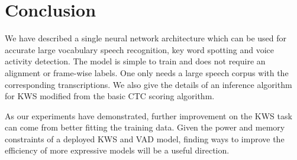 \section{Conclusion}
\label{sec:kws:conclusion}

We have described a single neural network architecture which can be used for
accurate large vocabulary speech recognition, key word spotting and voice
activity detection. The model is simple to train and does not require an
alignment or frame-wise labels. One only needs a large speech corpus with the
corresponding transcriptions. We also give the details of an inference
algorithm for KWS modified from the basic CTC scoring algorithm.

As our experiments have demonstrated, further improvement on the KWS task can
come from better fitting the training data. Given the power and memory
constraints of a deployed KWS and VAD model, finding ways to improve the
efficiency of more expressive models will be a useful direction.
